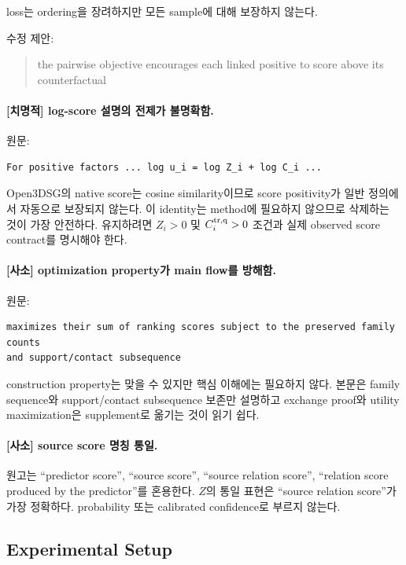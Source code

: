 \documentclass[11pt]{article}
\newcommand{\fatal}{\textbf{\textcolor{fatalred}{[치명적]}}}
\newcommand{\minor}{\textbf{\textcolor{minorblue}{[사소]}}}
\begin{document}
loss는 ordering을 장려하지만 모든 sample에 대해 보장하지 않는다.

수정 제안:
\begin{quote}
the pairwise objective encourages each linked positive to score above its
counterfactual
\end{quote}

\paragraph{\fatal{} log-score 설명의 전제가 불명확함.}

원문:
\begin{verbatim}
For positive factors ... log u_i = log Z_i + log C_i ...
\end{verbatim}

Open3DSG의 native score는 cosine similarity이므로 score positivity가 일반 정의에서
자동으로 보장되지 않는다. 이 identity는 method에 필요하지 않으므로 삭제하는 것이
가장 안전하다. 유지하려면 $Z_i>0$ 및 $C_i^{\rm tr,q}>0$ 조건과 실제 observed score
contract를 명시해야 한다.

\paragraph{\minor{} optimization property가 main flow를 방해함.}

원문:
\begin{verbatim}
maximizes their sum of ranking scores subject to the preserved family counts
and support/contact subsequence
\end{verbatim}

construction property는 맞을 수 있지만 핵심 이해에는 필요하지 않다. 본문은 family
sequence와 support/contact subsequence 보존만 설명하고 exchange proof와 utility
maximization은 supplement로 옮기는 것이 읽기 쉽다.

\paragraph{\minor{} source score 명칭 통일.}

원고는 ``predictor score'', ``source score'', ``source relation score'', ``relation
score produced by the predictor''를 혼용한다. $Z$의 통일 표현은 ``source relation
score''가 가장 정확하다. probability 또는 calibrated confidence로 부르지 않는다.

\subsection{Experimental Setup}
\end{document}
